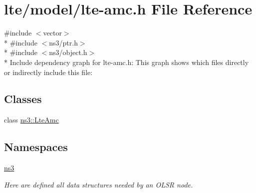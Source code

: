 \hypertarget{lte-amc_8h}{}\section{lte/model/lte-\/amc.h File Reference}
\label{lte-amc_8h}
{\ttfamily \#include $<$vector$>$}\\*
{\ttfamily \#include $<$ns3/ptr.\+h$>$}\\*
{\ttfamily \#include $<$ns3/object.\+h$>$}\\*
Include dependency graph for lte-\/amc.h\+:
This graph shows which files directly or indirectly include this file\+:
\subsection*{Classes}
\begin{DoxyCompactItemize}
\item 
class \hyperlink{classns3_1_1LteAmc}{ns3\+::\+Lte\+Amc}
\end{DoxyCompactItemize}
\subsection*{Namespaces}
\begin{DoxyCompactItemize}
\item 
 \hyperlink{namespacens3}{ns3}
\begin{DoxyCompactList}\small\item\em Here are defined all data structures needed by an O\+L\+SR node. \end{DoxyCompactList}\end{DoxyCompactItemize}
